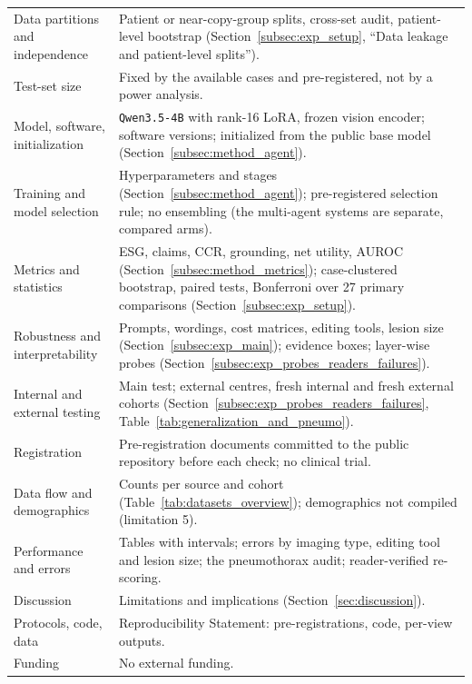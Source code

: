 \documentclass[10pt]{article}
\begin{document}
\begin{table}[!htbp]
\begin{center}
\begin{adjustbox}{max width=\linewidth}
\begin{tabular}{L{3.6cm}L{9.6cm}}
Data partitions and independence & Patient or near-copy-group splits, cross-set audit, patient-level bootstrap (Section~\ref{subsec:exp_setup}, ``Data leakage and patient-level splits''). \\
Test-set size & Fixed by the available cases and pre-registered, not by a power analysis. \\
Model, software, initialization & \texttt{Qwen3.5-4B} with rank-16 LoRA, frozen vision encoder; software versions; initialized from the public base model (Section~\ref{subsec:method_agent}). \\
Training and model selection & Hyperparameters and stages (Section~\ref{subsec:method_agent}); pre-registered selection rule; no ensembling (the multi-agent systems are separate, compared arms). \\
Metrics and statistics & ESG, claims, CCR, grounding, net utility, AUROC (Section~\ref{subsec:method_metrics}); case-clustered bootstrap, paired tests, Bonferroni over 27 primary comparisons (Section~\ref{subsec:exp_setup}). \\
Robustness and interpretability & Prompts, wordings, cost matrices, editing tools, lesion size (Section~\ref{subsec:exp_main}); evidence boxes; layer-wise probes (Section~\ref{subsec:exp_probes_readers_failures}). \\
Internal and external testing & Main test; external centres, fresh internal and fresh external cohorts (Section~\ref{subsec:exp_probes_readers_failures}, Table~\ref{tab:generalization_and_pneumo}). \\
Registration & Pre-registration documents committed to the public repository before each check; no clinical trial. \\
Data flow and demographics & Counts per source and cohort (Table~\ref{tab:datasets_overview}); demographics not compiled (limitation 5). \\
Performance and errors & Tables with intervals; errors by imaging type, editing tool and lesion size; the pneumothorax audit; reader-verified re-scoring. \\
Discussion & Limitations and implications (Section~\ref{sec:discussion}). \\
Protocols, code, data & Reproducibility Statement: pre-registrations, code, per-view outputs. \\
Funding & No external funding. \\
\bottomrule
\end{tabular}
\end{adjustbox}
\end{center}
\end{table}
\end{document}
